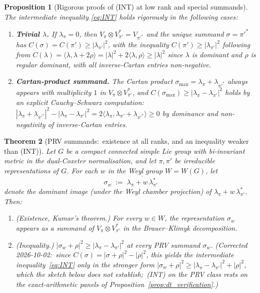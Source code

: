 \documentclass[11pt,a4paper]{article}
\theoremstyle{plain}
\newtheorem{theorem}{Theorem}[section]
\newtheorem{proposition}[theorem]{Proposition}
\theoremstyle{definition}
\newcommand{\Cas}{C}
\begin{document}
\begin{proposition}[Rigorous proofs of (INT) at low rank and special
summands]\label{prop:int_special_cases}
The intermediate inequality \eqref{eq:INT} holds rigorously in the
following cases:
\begin{enumerate}\setlength{\itemsep}{2pt}
\item[(i)] \textbf{Trivial $\lambda$.} If $\lambda_\pi = 0$, then
$V_\pi \otimes V_{\pi'}^* = V_{\pi'^*}$ and the unique summand
$\sigma = \pi'^*$ has $\Cas(\sigma) = \Cas(\pi') \ge |\lambda_{\pi'}|^2$,
with the inequality $\Cas(\pi') \ge |\lambda_{\pi'}|^2$ following from
$\Cas(\lambda) = \langle\lambda, \lambda + 2\rho\rangle = |\lambda|^2 +
2\langle\lambda, \rho\rangle \ge |\lambda|^2$ since $\lambda$ is
dominant and $\rho$ is regular dominant, with all inverse-Cartan
entries non-negative.
\item[(ii)] \textbf{Cartan-product summand.} The Cartan product
$\sigma_{\max} = \lambda_\pi + \lambda_{\pi'^*}$ always appears with
multiplicity $1$ in $V_\pi \otimes V_{\pi'}^*$, and
$\Cas(\sigma_{\max}) \ge |\lambda_\pi - \lambda_{\pi'}|^2$ holds by an
explicit Cauchy--Schwarz computation:\
$|\lambda_\pi + \lambda_{\pi'^*}|^2 - |\lambda_\pi - \lambda_{\pi'}|^2
= 2\langle \lambda_\pi, \lambda_{\pi'} + \lambda_{\pi'^*}\rangle \ge 0$
by dominance and non-negativity of inverse-Cartan entries.
\end{enumerate}
\end{proposition}

\begin{theorem}[PRV summands:\ existence at all ranks, and an inequality weaker than (INT)]\label{thm:prv_summand_bound}
Let $G$ be a compact connected simple Lie group with bi-invariant
metric in the dual-Coxeter normalisation, and let $\pi, \pi'$ be
irreducible representations of $G$. For each $w$ in the Weyl group
$W = W(G)$, let
\begin{equation}\label{eq:sigma_w}
   \sigma_w
   \;:=\; \overline{\lambda_\pi + w\,\lambda_{\pi'}^*}
\end{equation}
denote the dominant image (under the Weyl chamber projection) of
$\lambda_\pi + w\,\lambda_{\pi'}^*$. Then:
\begin{enumerate}\setlength{\itemsep}{2pt}
\item[(a)] (Existence, Kumar's theorem.) For every $w \in W$, the
representation $\sigma_w$ appears as a summand of
$V_\pi \otimes V_{\pi'}^*$ in the Brauer--Klimyk decomposition.
\item[(b)] (Inequality.) $|\sigma_w + \rho|^2 \ge
|\lambda_\pi - \lambda_{\pi'}|^2$ at every PRV summand $\sigma_w$.
(Corrected 2026-10-02:\ since $\Cas(\sigma) = |\sigma + \rho|^2 -
|\rho|^2$, this yields the intermediate inequality~\eqref{eq:INT} only in
the stronger form $|\sigma_w + \rho|^2 \ge |\lambda_\pi -
\lambda_{\pi'}|^2 + |\rho|^2$, which the sketch below does not
establish;\ (INT) on the PRV class rests on the exact-arithmetic panels
of Proposition~\ref{prop:dt_verification}.)
\end{enumerate}
\end{theorem}
\end{document}
